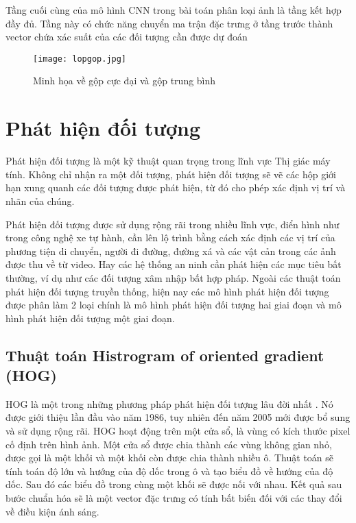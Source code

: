 \documentclass[../the.tex]{subfiles}
\begin{document}
\bigskip

{\fontsize{13}{12} \selectfont

	Tầng cuối cùng của mô hình CNN trong bài toán phân loại ảnh là tầng kết hợp đầy đủ. Tầng này có chức năng chuyển ma trận đặc trưng ở tầng trước thành vector chứa xác suất của các đối tượng cần được dự đoán

}
\begin{figure}[H]
	\centering
	\texttt{[image: lopgop.jpg]}
	\caption{Minh họa về gộp cực đại và gộp trung bình}
	\label{fig:polling}
\end{figure}
\section{Phát hiện đối tượng}
 {\fontsize{13}{12} \selectfont

  Phát hiện đối tượng là một kỹ thuật quan trọng trong lĩnh vực Thị giác máy tính. Không chỉ nhận ra một đối tượng,
  phát hiện đối tượng sẽ vẽ các hộp giới hạn xung quanh các đối tượng được phát hiện, từ đó
  cho phép xác định vị trí và nhãn của chúng.

 }

\bigskip

{\fontsize{13}{12} \selectfont

	Phát hiện đối tượng được sử dụng rộng rãi trong nhiều lĩnh vực, điển hình như trong công nghệ xe tự hành,
	cần lên lộ trình bằng cách xác định các vị trí của phương tiện di chuyển, người đi đường, đường xá và các vật cản trong các ảnh được thu về từ video. Hay các hệ thống an ninh cần phát hiện các mục tiêu bất thường, ví dụ như các đối tượng xâm nhập bất hợp pháp.
	Ngoài các thuật toán phát hiện đối tượng truyền thống, hiện nay các mô hình phát hiện đối tượng được phân làm 2 loại chính là mô hình phát hiện đối tượng hai giai đoạn và mô hình phát hiện đối tượng một giai đoạn.

}
\subsection{Thuật toán Histrogram of oriented gradient (HOG)}
{\fontsize{13}{12} \selectfont

	HOG là một trong những phương pháp phát hiện đối tượng lâu đời nhất \cite{dalal2005histograms}. Nó được giới thiệu lần đầu vào năm 1986,
	tuy nhiên đến năm 2005 mới được bổ sung và sử dụng rộng rãi. HOG hoạt động trên một cửa sổ, là vùng có kích thước pixel cố định trên hình ảnh. Một cửa sổ được chia thành các vùng không gian nhỏ, được gọi là một khối và một khối còn được chia thành nhiều ô.
	Thuật toán sẽ tính toán độ lớn và hướng của độ dốc trong ô và tạo biểu đồ về hướng của độ dốc. Sau đó các biểu đồ trong cùng một khối sẽ được nối với nhau.
	Kết quả sau bước chuẩn hóa sẽ là một vector đặc trưng có tính bất biến đối với các thay đổi về điều kiện ánh sáng.

}
\end{document}
